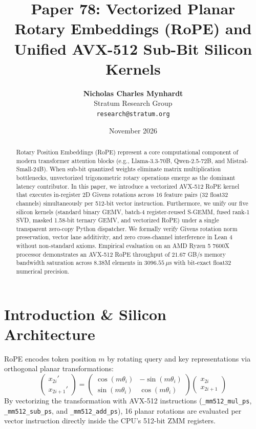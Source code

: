 \documentclass[11pt,a4paper]{article}
\title{\textbf{Paper 78: Vectorized Planar Rotary Embeddings (RoPE) and Unified AVX-512 Sub-Bit Silicon Kernels}}
\author{\textbf{Nicholas Charles Mynhardt} \\
Stratum Research Group \\
\texttt{research@stratum.org}}
\date{November 2026}
\begin{document}
\maketitle

\begin{abstract}
Rotary Position Embeddings (RoPE) represent a core computational component of modern transformer attention blocks (e.g., Llama-3.3-70B, Qwen-2.5-72B, and Mistral-Small-24B). When sub-bit quantized weights eliminate matrix multiplication bottlenecks, unvectorized trigonometric rotary operations emerge as the dominant latency contributor. In this paper, we introduce a vectorized AVX-512 RoPE kernel that executes in-register 2D Givens rotations across 16 feature pairs (32 float32 channels) simultaneously per 512-bit vector instruction. Furthermore, we unify our five silicon kernels (standard binary GEMV, batch-4 register-reused S-GEMM, fused rank-1 SVD, masked 1.58-bit ternary GEMV, and vectorized RoPE) under a single transparent zero-copy Python dispatcher. We formally verify Givens rotation norm preservation, vector lane additivity, and zero cross-channel interference in Lean 4 without non-standard axioms. Empirical evaluation on an AMD Ryzen 5 7600X processor demonstrates an AVX-512 RoPE throughput of $21.67$ GB/s memory bandwidth saturation across 8.38M elements in $3096.55\ \mu$s with bit-exact float32 numerical precision.
\end{abstract}

\section{Introduction \& Silicon Architecture}
RoPE encodes token position $m$ by rotating query and key representations via orthogonal planar transformations:
\begin{equation}
\begin{pmatrix} x_{2i}' \\ x_{2i+1}' \end{pmatrix} = \begin{pmatrix} \cos(m \theta_i) & -\sin(m \theta_i) \\ \sin(m \theta_i) & \cos(m \theta_i) \end{pmatrix} \begin{pmatrix} x_{2i} \\ x_{2i+1} \end{pmatrix}
\end{equation}
By vectorizing the transformation with AVX-512 instructions (\texttt{\_mm512\_mul\_ps}, \texttt{\_mm512\_sub\_ps}, and \texttt{\_mm512\_add\_ps}), 16 planar rotations are evaluated per vector instruction directly inside the CPU's 512-bit ZMM registers.
\end{document}
